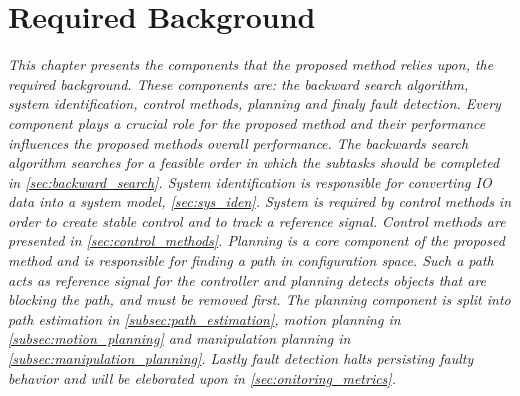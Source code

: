 \chapter{Required Background}%
\label{chap:required_background}
\textit{This chapter presents the components that the proposed method relies upon, the required background. These components are: the backward search algorithm, system identification, control methods, planning and finaly fault detection. Every component plays a crucial role for the proposed method and their performance influences the proposed methods overall performance. The backwards search algorithm searches for a feasible order in which the subtasks should be completed in \cref{sec:backward_search}. System identification is responsible for converting \ac{IO} data into a system model, \cref{sec:sys_iden}. System is required by control methods in order to create stable control and to track a reference signal. Control methods are presented in \cref{sec:control_methods}. Planning is a core component of the proposed method and is responsible for finding a path in configuration space. Such a path acts as reference signal for the controller and planning detects objects that are blocking the path, and must be removed first. The planning component is split into path estimation in \cref{subsec:path_estimation}, motion planning in \cref{subsec:motion_planning} and manipulation planning in \cref{subsec:manipulation_planning}. Lastly fault detection halts persisting faulty behavior and will be eleborated upon in \cref{sec:onitoring_metrics}.\bs}









